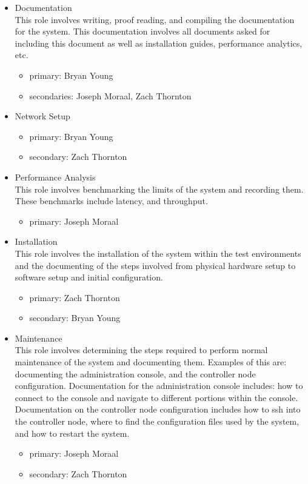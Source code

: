 \documentclass[11pt,a4paper]{article}
\begin{document}
\begin{itemize}
\begin{itemize}
    \end{itemize}
    \item{Documentation} \\
    This role involves writing, proof reading, and compiling the documentation for the system.  This documentation involves all documents asked for including this document as well as installation guides, performance analytics, etc.
    \begin{itemize}
        \item{primary: Bryan Young}
        \item{secondaries: Joseph Moraal, Zach Thornton}
    \end{itemize}
    \item{Network Setup}
    \begin{itemize}
        \item{primary: Bryan Young}
        \item{secondary: Zach Thornton}
    \end{itemize}
    \item{Performance Analysis} \\
    This role involves benchmarking the limits of the system and recording them.  These benchmarks include latency, and throughput. 
    \begin{itemize}
        \item{primary: Joseph Moraal}
    \end{itemize}
    \item{Installation} \\
    This role involves the installation of the system within the test environments and the documenting of the steps involved from physical hardware setup to software setup and initial configuration.
    \begin{itemize}
        \item{primary: Zach Thornton}
        \item{secondary: Bryan Young}
    \end{itemize}
    \item{Maintenance} \\
    This role involves determining the steps required to perform normal maintenance of the system and documenting them.  Examples of this are: documenting the administration console, and the controller node configuration.  Documentation for the administration console includes: how to connect to the console and navigate to different portions within the console.  Documentation on the controller node configuration includes how to ssh into the controller node, where to find the configuration files used by the system, and how to restart the system.
    \begin{itemize}
        \item{primary: Joseph Moraal}
        \item{secondary: Zach Thornton}
    \end{itemize}
\end{itemize}
\end{document}
